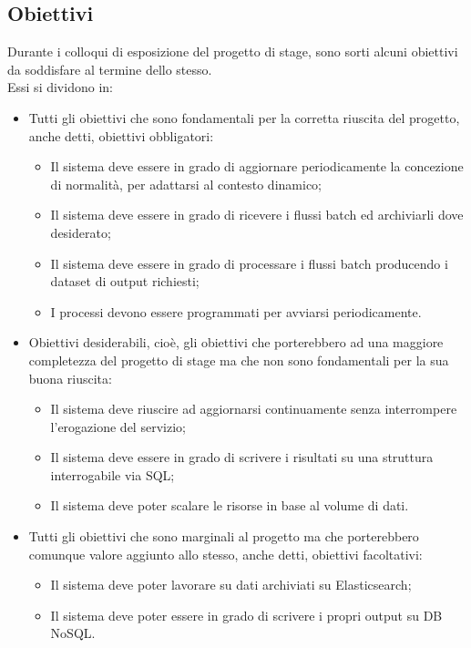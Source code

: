 \subsection{Obiettivi}
Durante i colloqui di esposizione del progetto di stage, sono sorti alcuni obiettivi da soddisfare al termine dello stesso.\\
Essi si dividono in:
\begin{itemize}
	\item Tutti gli obiettivi che sono fondamentali per la corretta riuscita del progetto, anche detti, obiettivi obbligatori:
	\begin{itemize}
		\item Il sistema deve essere in grado di aggiornare periodicamente la concezione di normalità, per adattarsi al contesto dinamico;	 
		\item Il sistema deve essere in grado di ricevere i flussi batch ed archiviarli dove desiderato;
		\item Il sistema deve essere in grado di processare i flussi batch producendo i dataset di output richiesti;
		\item I processi devono essere programmati per avviarsi periodicamente.
	\end{itemize}
	\item Obiettivi desiderabili, cioè, gli obiettivi che porterebbero ad una maggiore completezza del progetto di stage ma che non sono fondamentali per la sua buona riuscita:
		\begin{itemize}
		 \item Il sistema deve riuscire ad aggiornarsi continuamente senza interrompere l'erogazione del servizio;
		 \item Il sistema deve essere in grado di scrivere i risultati su una struttura interrogabile via SQL;
		 \item Il sistema deve poter scalare le risorse in base al volume di dati.
		\end{itemize}	
	\item Tutti gli obiettivi che sono marginali al progetto ma che porterebbero comunque valore aggiunto allo stesso, anche detti, obiettivi facoltativi:
	\begin{itemize}
		\item Il sistema deve poter lavorare su dati archiviati su Elasticsearch;
		\item Il sistema deve poter essere in grado di scrivere i propri output su DB NoSQL. 
	\end{itemize}
\end{itemize}
